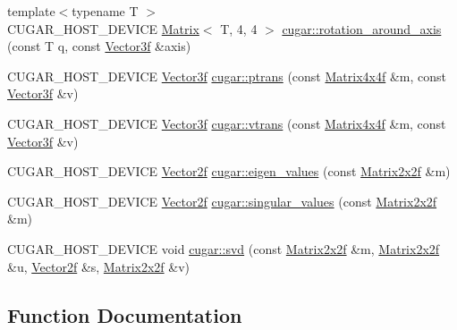 \begin{DoxyCompactItemize}
\item 
{\footnotesize template$<$typename T $>$ }\\C\+U\+G\+A\+R\+\_\+\+H\+O\+S\+T\+\_\+\+D\+E\+V\+I\+CE \hyperlink{structcugar_1_1_matrix}{Matrix}$<$ T, 4, 4 $>$ \hyperlink{group___matrices_module_ga5aabd5a72dab7887d3c7f21a58f4fd2e}{cugar\+::rotation\+\_\+around\+\_\+axis} (const T q, const \hyperlink{structcugar_1_1_vector}{Vector3f} \&axis)
\item 
C\+U\+G\+A\+R\+\_\+\+H\+O\+S\+T\+\_\+\+D\+E\+V\+I\+CE \hyperlink{structcugar_1_1_vector}{Vector3f} \hyperlink{group___matrices_module_ga5402d493f98fbe0feb20442d4e15ca02}{cugar\+::ptrans} (const \hyperlink{structcugar_1_1_matrix}{Matrix4x4f} \&m, const \hyperlink{structcugar_1_1_vector}{Vector3f} \&v)
\item 
C\+U\+G\+A\+R\+\_\+\+H\+O\+S\+T\+\_\+\+D\+E\+V\+I\+CE \hyperlink{structcugar_1_1_vector}{Vector3f} \hyperlink{group___matrices_module_ga1e73a0b256562dbf294f67516fcce100}{cugar\+::vtrans} (const \hyperlink{structcugar_1_1_matrix}{Matrix4x4f} \&m, const \hyperlink{structcugar_1_1_vector}{Vector3f} \&v)
\item 
C\+U\+G\+A\+R\+\_\+\+H\+O\+S\+T\+\_\+\+D\+E\+V\+I\+CE \hyperlink{structcugar_1_1_vector}{Vector2f} \hyperlink{group___matrices_module_gac5e231e656dbe04b10efcd989ef39874}{cugar\+::eigen\+\_\+values} (const \hyperlink{structcugar_1_1_matrix}{Matrix2x2f} \&m)
\item 
C\+U\+G\+A\+R\+\_\+\+H\+O\+S\+T\+\_\+\+D\+E\+V\+I\+CE \hyperlink{structcugar_1_1_vector}{Vector2f} \hyperlink{group___matrices_module_gaa1e73bc6264dda2d9b49c2f172565382}{cugar\+::singular\+\_\+values} (const \hyperlink{structcugar_1_1_matrix}{Matrix2x2f} \&m)
\item 
C\+U\+G\+A\+R\+\_\+\+H\+O\+S\+T\+\_\+\+D\+E\+V\+I\+CE void \hyperlink{group___matrices_module_gab83521723618b3ffc4eb605cc2e0580f}{cugar\+::svd} (const \hyperlink{structcugar_1_1_matrix}{Matrix2x2f} \&m, \hyperlink{structcugar_1_1_matrix}{Matrix2x2f} \&u, \hyperlink{structcugar_1_1_vector}{Vector2f} \&s, \hyperlink{structcugar_1_1_matrix}{Matrix2x2f} \&v)
\end{DoxyCompactItemize}


\subsection{Function Documentation}
\mbox{\label{group___matrices_module_ga280d2a0c34c9e17d89b638d5b71102f1}} 
